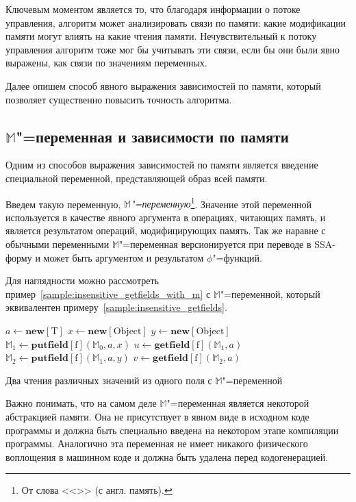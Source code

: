 \documentclass[14pt,titlepage,draft]{extarticle}
\newcommand{\M}{\ensuremath{\mathbb{M}}}
\let\mathphi\phi
\renewcommand{\phi}{\ensuremath{\mathphi}}
\newcommand{\type}[1]{\mathrm{#1}}
\newcommand{\field}[1]{\mathrm{#1}}
\newcommand{\op}[1]{\mathbf{#1}}
\begin{document}
    Ключевым моментом является то, что благодаря информации о потоке
    управления, алгоритм может анализировать связи по памяти: какие модификации
    памяти могут влиять на какие чтения памяти. Нечувствительный к потоку
    управления алгоритм тоже мог бы учитывать эти связи, если бы они были явно
    выражены, как связи по значениям переменных.

    Далее опишем способ явного выражения зависимостей по памяти, который
    позволяет существенно повысить точность алгоритма.

  \subsection{\texorpdfstring{\M}{M}"=переменная и зависимости по памяти}

    Одним из способов выражения зависимостей по памяти является введение
    специальной переменной, представляющей образ всей памяти.

    Введем такую переменную, \emph{\M"=переменную}\footnote{
      От слова <<>> (с англ. память).
    }.
    Значение этой переменной используется в качестве явного аргумента в
    операциях, читающих память, и является результатом операций, модифицирующих
    память. Так же наравне с обычными переменными \M"=переменная версионируется
    при переводе в SSA-форму и может быть аргументом и результатом
    \phi"=функций.

    Для наглядности можно рассмотреть
    пример~\ref{sample:insensitive_getfields_with_m} с \M"=переменной, который
    эквивалентен примеру~\ref{sample:insensitive_getfields}.

    \begin{sample}
      \begin{algorithmic}[1]
        \State $a \gets \op{new}[\type{T}]$
        \State $x \gets \op{new}[\type{Object}]$
        \State $y \gets \op{new}[\type{Object}]$
        \State $\M_1 \gets \op{putfield}[\field{f}](\M_0, a, x)$
        \State $u \gets \op{getfield}[\field{f}](\M_1, a)$
        \State $\M_2 \gets \op{putfield}[\field{f}](\M_1, a, y)$
        \State $v \gets \op{getfield}[\field{f}](\M_2, a)$
      \end{algorithmic}
      \caption{Два чтения различных значений из одного поля с \M"=переменной}
      \label{sample:insensitive_getfields_with_m}
    \end{sample}

    Важно понимать, что на самом деле \M"=переменная является некоторой
    абстракцией памяти. Она не присутствует в явном виде в исходном коде
    программы и должна быть специально введена на некотором этапе компиляции
    программы. Аналогично эта переменная не имеет никакого физического
    воплощения в машинном коде и должна быть удалена перед кодогенерацией.
\end{document}

